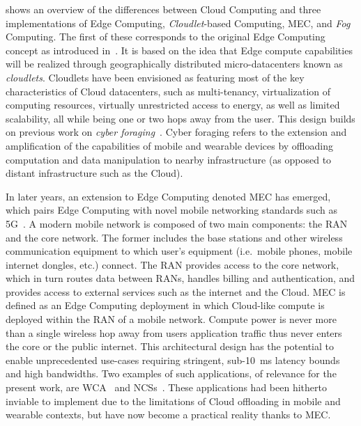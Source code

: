 

 shows an overview of the differences between Cloud Computing and three implementations of Edge Computing, \emph{Cloudlet}-based Computing, \gls{MEC}, and \emph{Fog} Computing.
The first of these corresponds to the original Edge Computing concept as introduced in~\citeauthor{satyanarayanan2009case}.
It is based on the idea that Edge compute capabilities will be realized through geographically distributed micro-datacenters known as \emph{cloudlets}.
Cloudlets have been envisioned as featuring most of the key characteristics of Cloud datacenters, such as multi-tenancy, virtualization of computing resources, virtually unrestricted access to energy, as well as limited scalability, all while being one or two hops away from the user.
This design builds on previous work on \emph{cyber foraging}~\cite{noble1997agile,flinn1999energy,satyanarayanan2001pervasive}.
Cyber foraging refers to the extension and amplification of the capabilities of mobile and wearable devices by offloading computation and data manipulation to nearby infrastructure (as opposed to distant infrastructure such as the Cloud).

%
%
In later years, an extension to Edge Computing denoted \gls{MEC} has emerged, which pairs Edge Computing with novel mobile networking standards such as 5G~\cite{hassan2019edge,pham2020survey,wan2020efficient}.
A modern mobile network is composed of two main components: the \gls{RAN} and the core network.
The former includes the base stations and other wireless communication equipment to which user's equipment (i.e.\ mobile phones, mobile internet dongles, etc.) connect. 
The \gls{RAN} provides access to the core network, which in turn routes data between \glspl{RAN}, handles billing and authentication, and provides access to external services such as the internet and the Cloud.
\gls{MEC} is defined as an Edge Computing deployment in which Cloud-like compute is deployed within the \gls{RAN} of a mobile network.
Compute power is never more than a single wireless hop away from users application traffic thus never enters the core or the public internet.
This architectural design has the potential to enable unprecedented use-cases requiring stringent, sub-\SI{10}{\milli\second} latency bounds and high bandwidths.
Two examples of such applications, of relevance for the present work, are \acl{WCA}~\cite{ha2014towards,chen2018application,wang2020scaling,chen2017empirical,chen2018application} and \aclp{NCS}~\cite{sasaki2016vehicle,wang2018bandwidth,wan2020efficient}.
These applications had been hitherto inviable to implement due to the limitations of Cloud offloading in mobile and wearable contexts, but have now become a practical reality thanks to \gls{MEC}.


